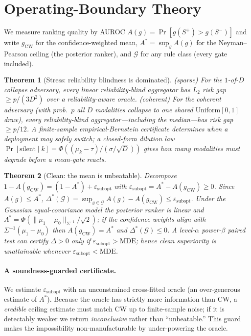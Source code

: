 \documentclass[11pt]{article}
\newtheorem{theorem}{Theorem}
\begin{document}
\section{Operating-Boundary Theory}
We measure ranking quality by AUROC $A(g)=\Pr[g(S^+)>g(S^-)]$ and write
$g_{\mathrm{CW}}$ for the confidence-weighted mean, $A^{*}=\sup_g A(g)$ for the
Neyman--Pearson ceiling (the posterior ranker), and $\mathcal{G}$ for any rule class
(every gate included).

\begin{theorem}[Stress: reliability blindness is dominated]\label{thm:stress}
\emph{(sparse)} For the $1$-of-$D$ collapse adversary, every linear reliability-blind
aggregator has $L_2$ risk gap $\ge p/(3D^2)$ over a reliability-aware oracle.
\emph{(coherent)} For the coherent adversary (with prob.\ $p$ all $D$ modalities
collapse to one shared $\mathrm{Uniform}[0,1]$ draw), \emph{every} reliability-blind
aggregator---including the median---has risk gap $\ge p/12$. A finite-sample
empirical-Bernstein certificate determines when a deployment may safely switch; a
closed-form dilution law $\Pr[\text{silent}\mid k]=\Phi((\mu_k-\tau)/(\sigma/\sqrt D))$
gives how many modalities must degrade before a mean-gate reacts.
\end{theorem}

\begin{theorem}[Clean: the mean is unbeatable]\label{thm:clean}
Decompose $1-A(g_{\mathrm{CW}})=(1-A^{*})+\varepsilon_{\mathrm{subopt}}$ with
$\varepsilon_{\mathrm{subopt}}=A^{*}-A(g_{\mathrm{CW}})\ge0$. Since $A(g)\le A^{*}$,
$\Delta^{*}(\mathcal{G})=\sup_{g\in\mathcal G}A(g)-A(g_{\mathrm{CW}})\le
\varepsilon_{\mathrm{subopt}}$. Under the Gaussian equal-covariance model the
posterior ranker is linear and $A^{*}=\Phi(\lVert\mu_1-\mu_0\rVert_{\Sigma^{-1}}/
\sqrt2)$; if the confidence weights align with $\Sigma^{-1}(\mu_1-\mu_0)$ then
$A(g_{\mathrm{CW}})=A^{*}$ and $\Delta^{*}(\mathcal{G})\le 0$. A level-$\alpha$
power-$\beta$ paired test can certify $\Delta>0$ only if
$\varepsilon_{\mathrm{subopt}}>\mathrm{MDE}$; hence clean superiority is
\emph{unattainable} whenever $\varepsilon_{\mathrm{subopt}}<\mathrm{MDE}$.
\end{theorem}

\paragraph{A soundness-guarded certificate.} We estimate $\varepsilon_{\mathrm{subopt}}$
with an unconstrained cross-fitted oracle (an over-generous estimate of $A^{*}$).
Because the oracle has strictly more information than CW, a \emph{credible} ceiling
estimate must match CW up to finite-sample noise; if it is detectably weaker we
return \emph{inconclusive} rather than ``unbeatable.'' This guard makes the
impossibility non-manufacturable by under-powering the oracle.
\end{document}

